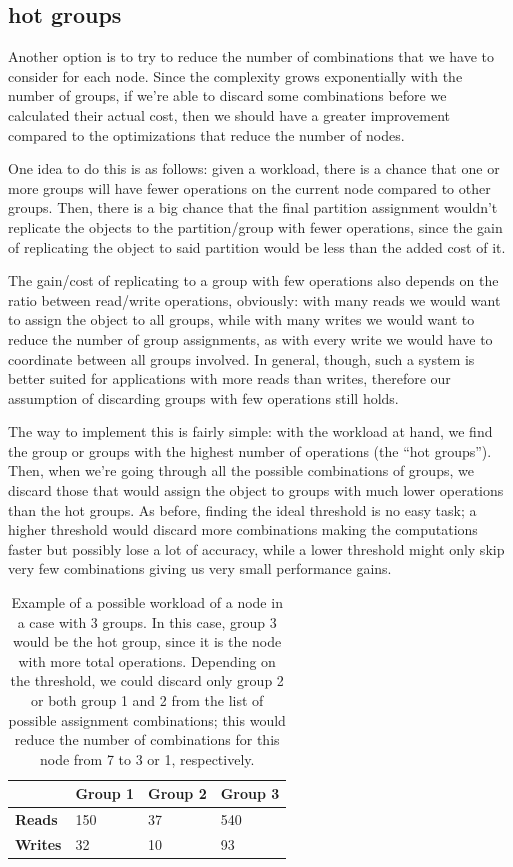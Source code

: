 \subsection{hot groups}\label{sec:hot-groups}
Another option is to try to reduce the number of combinations that we have to consider for each node. Since the complexity grows exponentially with the number of groups, if we're able to discard some combinations before we calculated their actual cost, then we should have a greater improvement compared to the optimizations that reduce the number of nodes.

One idea to do this is as follows: given a workload, there is a chance that one or more groups will have fewer operations on the current node compared to other groups. Then, there is a big chance that the final partition assignment wouldn't replicate the objects to the partition/group with fewer operations, since the gain of replicating the object to said partition would be less than the added cost of it.

The gain/cost of replicating to a group with few operations also depends on the ratio between read/write operations, obviously: with many reads we would want to assign the object to all groups, while with many writes we would want to reduce the number of group assignments, as with every write we would have to coordinate between all groups involved. In general, though, such a system is better suited for applications with more reads than writes, therefore our assumption of discarding groups with few operations still holds.

The way to implement this is fairly simple: with the workload at hand, we find the group or groups with the highest number of operations (the ``hot groups''). Then, when we're going through all the possible combinations of groups, we discard those that would assign the object to groups with much lower operations than the hot groups. As before, finding the ideal threshold is no easy task; a higher threshold would discard more combinations making the computations faster but possibly lose a lot of accuracy, while a lower threshold might only skip very few combinations giving us very small performance gains. 


\begin{table}[htb]
  \centering
  \begin{tabular}{l l l l}
    \hline
    & \textbf{Group 1} & \textbf{Group 2} & \textbf{Group 3} \\
    \hline
    \textbf{Reads} & 150 & 37 & 540 \\
    \textbf{Writes} & 32 & 10 & 93 \\
    \hline
  \end{tabular}
  \caption{Example of a possible workload of a node in a case with 3 groups. In this case, group 3 would be the hot group, since it is the node with more total operations. Depending on the threshold, we could discard only group 2 or both group 1 and 2 from the list of possible assignment combinations; this would reduce the number of combinations for this node from 7 to 3 or 1, respectively.}\label{tab:workload-example}
\end{table}

